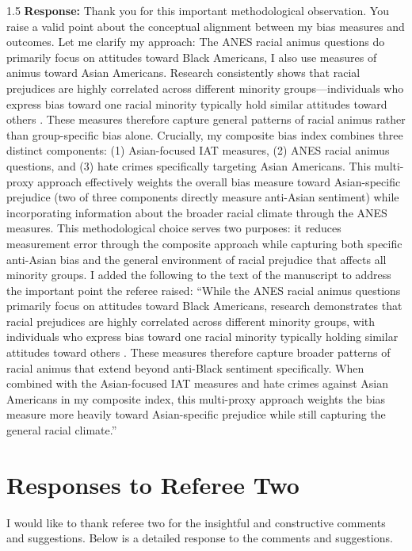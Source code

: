 \documentclass[12pt,english]{article}
\newcommand{\rrxspc}{1.5}
\begin{document}
\begin{refsection}
    \begin{spacing}{\rrxspc}
       \textbf{Response:} Thank you for this important methodological observation. You raise a valid point about the conceptual alignment between my bias measures and outcomes. Let me clarify my approach: The ANES racial animus questions do primarily focus on attitudes toward Black Americans, I also use measures of animus toward Asian Americans. Research consistently shows that racial prejudices are highly correlated across different minority groups—individuals who express bias toward one racial minority typically hold similar attitudes toward others \autocite{almasalkhi2023links, mora2020antiblackness}. These measures therefore capture general patterns of racial animus rather than group-specific bias alone. Crucially, my composite bias index combines three distinct components: (1) Asian-focused IAT measures, (2) ANES racial animus questions, and (3) hate crimes specifically targeting Asian Americans. This multi-proxy approach effectively weights the overall bias measure toward Asian-specific prejudice (two of three components directly measure anti-Asian sentiment) while incorporating information about the broader racial climate through the ANES measures. This methodological choice serves two purposes: it reduces measurement error through the composite approach while capturing both specific anti-Asian bias and the general environment of racial prejudice that affects all minority groups. I added the following to the text of the manuscript to address the important point the referee raised: ``While the ANES racial animus questions primarily focus on attitudes toward Black Americans, research demonstrates that racial prejudices are highly correlated across different minority groups, with individuals who express bias toward one racial minority typically holding similar attitudes toward others \autocite{almasalkhi2023links, mora2020antiblackness}. These measures therefore capture broader patterns of racial animus that extend beyond anti-Black sentiment specifically. When combined with the Asian-focused IAT measures and hate crimes against Asian Americans in my composite index, this multi-proxy approach weights the bias measure more heavily toward Asian-specific prejudice while still capturing the general racial climate.''
    \end{spacing}
    \clearpage
    \pagebreak

    \section{Responses to Referee Two}
    I would like to thank referee two for the insightful and constructive comments and suggestions. Below is a detailed response to the comments and suggestions.


\end{refsection}
\end{document}
